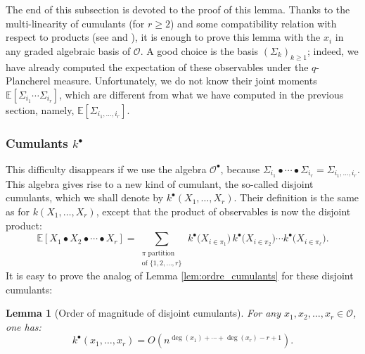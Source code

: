 \documentclass[10pt]{amsart}
\newtheorem{lemma}[theorem]{Lemma}
\theoremstyle{remark}
\newcommand{\esper}{\mathbb{E}}
\newcommand{\obs}{\mathscr{O}}
\begin{document}
The end of this subsection is devoted to the proof of this lemma.
Thanks to the multi-linearity of cumulants (for $r\geq 2$) and some compatibility relation with respect to products (see \cite{LS59} and \cite[Theorem 4.4]{Sniady06}), it is enough to prove this lemma with the $x_i$ in any graded algebraic basis of $\obs$. A good choice is the basis $(\varSigma_k)_{k\geq 1}$; indeed, we have already computed the expectation of these observables under the $q$-Plancherel measure. Unfortunately, we do not know their joint moments $\esper[\varSigma_{i_1} \cdots \varSigma_{i_r}]$, which are different from what we have computed in the previous section, namely, $\esper[\varSigma_{i_1,\ldots,i_r}]$.\bigskip

\subsubsection{Cumulants $k^\bullet$}
This difficulty disappears if we use the algebra $\obs^\bullet$, because $\Sigma_{i_1} \bullet \cdots \bullet \Sigma_{i_r}=\Sigma_{i_1,\ldots,i_r}$. This algebra gives rise to a new kind of cumulant, the so-called disjoint cumulants, which we shall denote by $k^\bullet(X_{1},\ldots,X_{r})$. Their definition is the same as for $k(X_1,\ldots,X_r)$, except that the product of observables is now the disjoint product:
\begin{equation}\label{eq:def_dis_cum}
\esper[X_1 \bullet X_2 \bullet \cdots \bullet X_r]=\sum_{\substack{\pi \text{ partition}\\ \text{of } \{1,2,\ldots,r\} }} \, k^\bullet\big(X_{i \in \pi_1}\big) \, k^\bullet\big(X_{i \in \pi_2}\big) \cdots k^\bullet\big(X_{i \in \pi_\ell}\big).
\end{equation}
It is easy to prove the analog of Lemma \ref{lem:ordre_cumulants} for these disjoint cumulants:
\begin{lemma}[Order of magnitude of disjoint cumulants]\label{lem:ordre_disjoint_cumulants}
For any $x_1,x_2,\ldots,x_r \in \obs$, one has:
$$k^\bullet(x_1,\ldots,x_r) = O\left(n^{\deg(x_1) + \cdots + \deg(x_r)-r+1}\right).$$
\end{lemma}\bigskip
\end{document}
